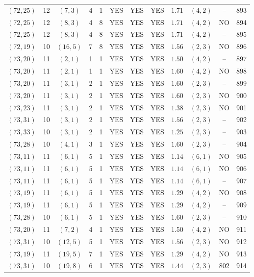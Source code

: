 \begin{longtable}{|c|c|c|c|c|c|c|c|c|c|c|c|}
$(72,25)$ & 12 & $(7,3)$ & 4 & 1 & YES & YES & YES & $1.71$ & $(4,2)$ & -- & 893\\
$(72,25)$ & 12 & $(8,3)$ & 4 & 8 & YES & YES & YES & $1.71$ & $(4,2)$ & NO & 894\\
$(72,25)$ & 12 & $(8,3)$ & 4 & 8 & YES & YES & YES & $1.71$ & $(4,2)$ & -- & 895\\
$(72,19)$ & 10 & $(16,5)$ & 7 & 8 & YES & YES & YES & $1.56$ & $(2,3)$ & NO & 896\\
$(73,20)$ & 11 & $(2,1)$ & 1 & 1 & YES & YES & YES & $1.50$ & $(4,2)$ & -- & 897\\
$(73,20)$ & 11 & $(2,1)$ & 1 & 1 & YES & YES & YES & $1.60$ & $(4,2)$ & NO & 898\\
$(73,20)$ & 11 & $(3,1)$ & 2 & 1 & YES & YES & YES & $1.60$ & $(2,3)$ & -- & 899\\
$(73,20)$ & 11 & $(3,1)$ & 2 & 1 & YES & YES & YES & $1.60$ & $(2,3)$ & NO & 900\\
$(73,23)$ & 11 & $(3,1)$ & 2 & 1 & YES & YES & YES & $1.38$ & $(2,3)$ & NO & 901\\
$(73,31)$ & 10 & $(3,1)$ & 2 & 1 & YES & YES & YES & $1.56$ & $(2,3)$ & -- & 902\\
$(73,33)$ & 10 & $(3,1)$ & 2 & 1 & YES & YES & YES & $1.25$ & $(2,3)$ & -- & 903\\
$(73,28)$ & 10 & $(4,1)$ & 3 & 1 & YES & YES & YES & $1.60$ & $(2,3)$ & -- & 904\\
$(73,11)$ & 11 & $(6,1)$ & 5 & 1 & YES & YES & YES & $1.14$ & $(6,1)$ & NO & 905\\
$(73,11)$ & 11 & $(6,1)$ & 5 & 1 & YES & YES & YES & $1.14$ & $(6,1)$ & NO & 906\\
$(73,11)$ & 11 & $(6,1)$ & 5 & 1 & YES & YES & YES & $1.14$ & $(6,1)$ & -- & 907\\
$(73,19)$ & 11 & $(6,1)$ & 5 & 1 & YES & YES & YES & $1.29$ & $(4,2)$ & NO & 908\\
$(73,19)$ & 11 & $(6,1)$ & 5 & 1 & YES & YES & YES & $1.29$ & $(4,2)$ & -- & 909\\
$(73,28)$ & 10 & $(6,1)$ & 5 & 1 & YES & YES & YES & $1.60$ & $(2,3)$ & -- & 910\\
$(73,20)$ & 11 & $(7,2)$ & 4 & 1 & YES & YES & YES & $1.50$ & $(4,2)$ & NO & 911\\
$(73,31)$ & 10 & $(12,5)$ & 5 & 1 & YES & YES & YES & $1.56$ & $(2,3)$ & NO & 912\\
$(73,19)$ & 11 & $(19,5)$ & 7 & 1 & YES & YES & YES & $1.29$ & $(4,2)$ & NO & 913\\
$(73,31)$ & 10 & $(19,8)$ & 6 & 1 & YES & YES & YES & $1.44$ & $(2,3)$ & 802 & 914\\

\end{longtable}
